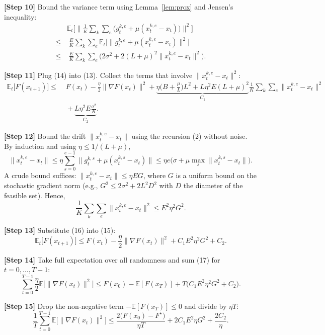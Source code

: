 \documentclass[11pt]{article}
\begin{document}
\noindent\textbf{[Step 10]} Bound the variance term using Lemma~\ref{lem:prox} and Jensen’s inequality:
\[
\begin{aligned}
&\mathbb{E}_t\!\Big[\Big\|\frac1K\sum_{k}\sum_{e}\big(g_{t}^{k,e}+\mu (x_{t}^{k,e}-x_t)\big)\Big\|^{2}\Big] \\
\le &\;\frac{E}{K}\sum_{k}\sum_{e}\mathbb{E}_t\!\big[\|g_{t}^{k,e}+\mu (x_{t}^{k,e}-x_t)\|^{2}\big] \\
\le &\;\frac{E}{K}\sum_{k}\sum_{e}\big(2\sigma^{2}+2(L+\mu)^{2}\|x_{t}^{k,e}-x_t\|^{2}\big) .
\end{aligned}
\tag{14}
\]

\noindent\textbf{[Step 11]} Plug (14) into (13). Collect the terms that involve $\|x_{t}^{k,e}-x_t\|^{2}$:
\[
\begin{aligned}
\mathbb{E}_t\!\big[F(x_{t+1})\big]
\le &\;F(x_t)-\frac{\eta}{2}\|\nabla F(x_t)\|^{2}
     +\underbrace{\eta\Big(B+\tfrac{\mu}{L}\Big)L^{2}
          +L\eta^{2}E(L+\mu)^{2}}_{\displaystyle C_{1}}\frac1K\sum_{k}\sum_{e}\|x_{t}^{k,e}-x_t\|^{2}\\
     &\;+\underbrace{L\eta^{2}E\frac{\sigma^{2}}{K}}_{\displaystyle C_{2}} .
\end{aligned}
\tag{15}
\]

\noindent\textbf{[Step 12]} Bound the drift $\|x_{t}^{k,e}-x_t\|$ using the recursion (2) without noise. By induction and using $\eta\le 1/(L+\mu)$,
\[
\|x_{t}^{k,e}-x_t\|\le \eta\sum_{s=0}^{e-1}\|g_{t}^{k,s}+\mu (x_{t}^{k,s}-x_t)\|
\le \eta e\big(\sigma +\mu\max_{s}\|x_{t}^{k,s}-x_t\|\big) .
\]
A crude bound suffices: $\|x_{t}^{k,e}-x_t\|\le \eta E G$, where $G$ is a uniform bound on the stochastic gradient norm (e.g., $G^2\le 2\sigma^{2}+2L^{2}D^{2}$ with $D$ the diameter of the feasible set). Hence,
\[
\frac1K\sum_{k}\sum_{e}\|x_{t}^{k,e}-x_t\|^{2}\le E^{2}\eta^{2}G^{2}.
\tag{16}
\]

\noindent\textbf{[Step 13]} Substitute (16) into (15):
\[
\mathbb{E}_t\!\big[F(x_{t+1})\big]
\le F(x_t)-\frac{\eta}{2}\|\nabla F(x_t)\|^{2}
      + C_{1}E^{2}\eta^{2}G^{2}+C_{2}.
\tag{17}
\]

\noindent\textbf{[Step 14]} Take full expectation over all randomness and sum (17) for $t=0,\dots,T-1$:
\[
\sum_{t=0}^{T-1}\frac{\eta}{2}\mathbb{E}\big[\|\nabla F(x_t)\|^{2}\big]
\le F(x_0)-\mathbb{E}[F(x_T)]+T\big(C_{1}E^{2}\eta^{2}G^{2}+C_{2}\big).
\tag{18}
\]

\noindent\textbf{[Step 15]} Drop the non‑negative term $-\mathbb{E}[F(x_T)]\le 0$ and divide by $\eta T$:
\[
\frac1T\sum_{t=0}^{T-1}\mathbb{E}\big[\|\nabla F(x_t)\|^{2}\big]
\le \frac{2\big(F(x_0)-F^\star\big)}{\eta T}
   +2C_{1}E^{2}\eta G^{2}+ \frac{2C_{2}}{\eta}.
\tag{19}
\]
\end{document}
